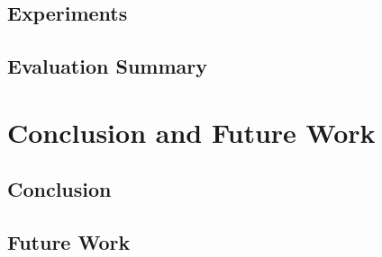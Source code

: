 \documentclass[UKenglish, a4paper]{ifimaster}
\begin{document}
    \section{Experiments}
    \section{Evaluation Summary}

\chapter{Conclusion and Future Work}
\label{ch:conclusion-and-future-work}
    \section{Conclusion}
    \section{Future Work}


\backmatter{}
\printbibliography{}
\end{document}
